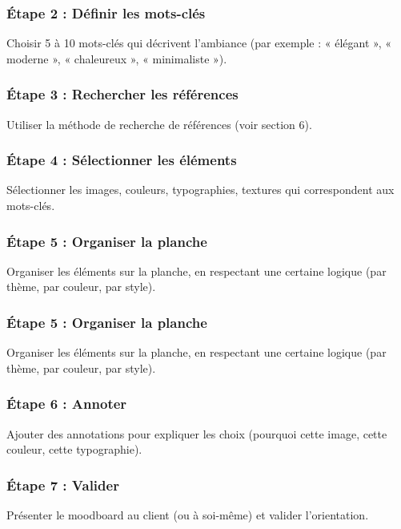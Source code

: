 \subsubsection{Étape 2 : Définir les mots-clés}

Choisir 5 à 10 mots-clés qui décrivent l'ambiance (par exemple : « élégant », « moderne », « chaleureux », « minimaliste »).

\subsubsection{Étape 3 : Rechercher les références}

Utiliser la méthode de recherche de références (voir section 6).

\subsubsection{Étape 4 : Sélectionner les éléments}

Sélectionner les images, couleurs, typographies, textures qui correspondent aux mots-clés.

\subsubsection{Étape 5 : Organiser la planche}

Organiser les éléments sur la planche, en respectant une certaine logique (par thème, par couleur, par style).

\subsubsection{Étape 5 : Organiser la planche}

Organiser les éléments sur la planche, en respectant une certaine logique (par thème, par couleur, par style).

\subsubsection{Étape 6 : Annoter}

Ajouter des annotations pour expliquer les choix (pourquoi cette image, cette couleur, cette typographie).

\subsubsection{Étape 7 : Valider}

Présenter le moodboard au client (ou à soi-même) et valider l'orientation.

